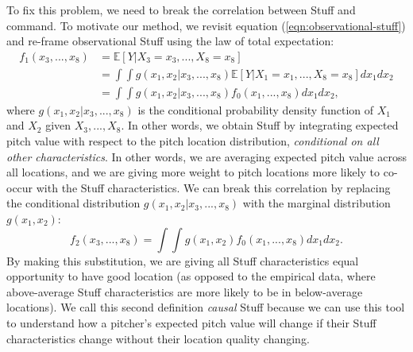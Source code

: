 \documentclass{article}
\begin{document}
    To fix this problem, we need to break the correlation between Stuff and command. To motivate our method, we revisit equation (\ref{eqn:observational-stuff}) and re-frame observational Stuff using the law of total expectation:
    \begin{align*}
      f_1(x_3, ..., x_8)  &= \mathbb{E}[Y | X_3 = x_3, ..., X_8 = x_8]\\
                          &= \int \int g(x_1, x_2 | x_3, ..., x_8) \mathbb{E}[Y | X_1 = x_1, ..., X_8 = x_8] dx_1 dx_2\\
                          &= \int \int g(x_1, x_2 | x_3, ..., x_8) f_0(x_1, ..., x_8) dx_1 dx_2,
    \end{align*}
    where $g(x_1, x_2 | x_3, ..., x_8)$ is the conditional probability density function of $X_1$ and $X_2$ given $X_3, ..., X_8$. In other words, we obtain Stuff by integrating expected pitch value with respect to the pitch location distribution, {\it conditional on all other characteristics}. In other words, we are averaging expected pitch value across all locations, and we are giving more weight to pitch locations more likely to co-occur with the Stuff characteristics. We can break this correlation by replacing the conditional distribution $g(x_1, x_2 | x_3, ..., x_8)$ with the marginal distribution $g(x_1, x_2)$:
    \begin{equation*}
      f_2(x_3, ..., x_8)  = \int \int g(x_1, x_2) f_0(x_1, ..., x_8) dx_1 dx_2.
    \end{equation*}
    By making this substitution, we are giving all Stuff characteristics equal opportunity to have good location (as opposed to the empirical data, where above-average Stuff characteristics are more likely to be in below-average locations). We call this second definition {\it causal} Stuff because we can use this tool to understand how a pitcher's expected pitch value will change if their Stuff characteristics change without their location quality changing.
\end{document}

